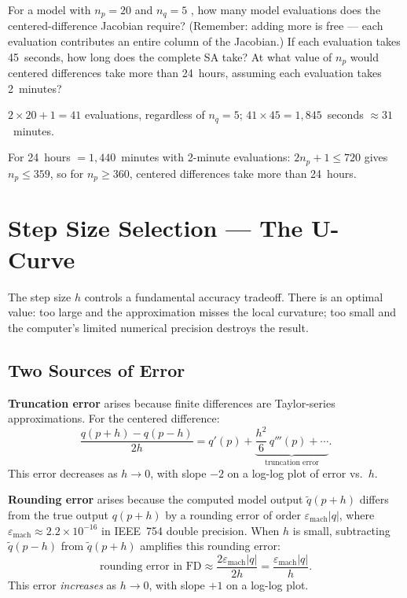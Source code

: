 \begin{selfcheck}
For a model with $n_p = 20$ \POIs and $n_q = 5$ \QOIs,
how many model evaluations does the centered-difference Jacobian require?
(Remember: adding more \QOIs is free --- each evaluation contributes
an entire column of the Jacobian.)
If each evaluation takes 45~seconds, how long does the complete SA take?
At what value of $n_p$ would centered differences take more than 24~hours,
assuming each evaluation takes 2~minutes?
\end{selfcheck}
\begin{scAnswer}
$2 \times 20 + 1 = 41$ evaluations, regardless of $n_q = 5$;
$41 \times 45 = 1{,}845$~seconds $\approx 31$~minutes.

For 24~hours $= 1{,}440$~minutes with 2-minute evaluations:
$2n_p + 1 \leq 720$ gives $n_p \leq 359$, so for $n_p \geq 360$,
centered differences take more than 24~hours.
\end{scAnswer}

\section{Step Size Selection --- The U-Curve}
\label{sec:ucurve}

The step size $h$ controls a fundamental accuracy tradeoff.
There is an optimal value: too large and the approximation
misses the local curvature; too small and the computer's
limited numerical precision destroys the result.

\subsection{Two Sources of Error}

\textbf{Truncation error} arises because finite differences
are Taylor-series approximations. For the centered difference:
\begin{equation}
  \frac{q(p+h) - q(p-h)}{2h}
  = q'(p) + \underbrace{\frac{h^2}{6}\,q'''(p) + \cdots}_{\text{truncation error}}.
  \label{eq:FD2truncation}
\end{equation}
This error decreases as $h \to 0$, with slope $-2$ on a log-log
plot of error vs.\ $h$.

\textbf{Rounding error} arises because the computed model output
$\tilde{q}(p+h)$ differs from the true output $q(p+h)$ by a
rounding error of order $\varepsilon_{\text{mach}}|q|$,
where $\varepsilon_{\text{mach}} \approx 2.2 \times 10^{-16}$
in IEEE~754 double precision.
When $h$ is small, subtracting $\tilde{q}(p-h)$ from $\tilde{q}(p+h)$
amplifies this rounding error:
\begin{equation}
  \text{rounding error in FD} \approx
  \frac{2\varepsilon_{\text{mach}}|q|}{2h} = \frac{\varepsilon_{\text{mach}}|q|}{h}.
  \label{eq:FD2rounding}
\end{equation}
This error \emph{increases} as $h \to 0$, with slope $+1$ on a
log-log plot.

